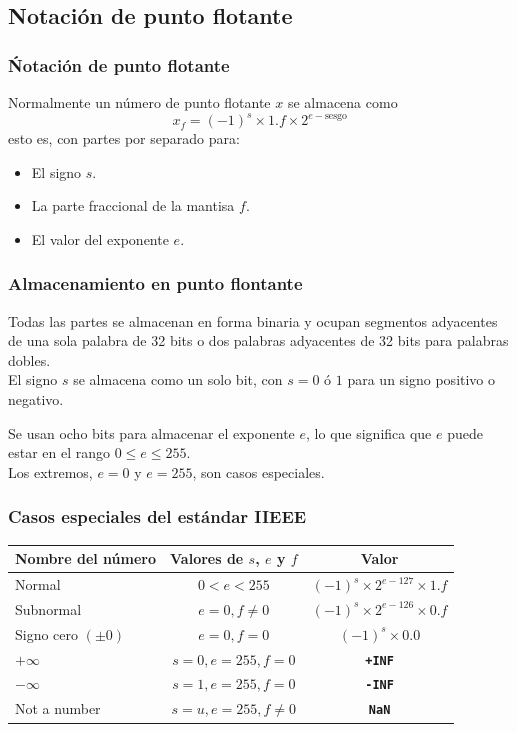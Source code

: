  \subsection{Notación de punto flotante}
 \begin{frame}
 \frametitle{Ńotación de punto flotante}
 Normalmente un número de punto flotante $x$ se almacena como
 \begin{equation}
 x_{f} = (-1)^{s} \times 1.f \times 2^{e - \text{sesgo}}
 \label{eq:ecuacion_01_02}
 \end{equation}
 esto es, con partes por separado para:
 \begin{itemize}[<+->]
 \item El signo $s$.
 \item La parte fraccional de la mantisa $f$.
 \item El valor del exponente $e$.
\end{itemize}
\end{frame}
\begin{frame}
\frametitle{Almacenamiento en punto flontante}
Todas las partes se almacenan en forma binaria y ocupan segmentos adyacentes de una sola palabra de 32 bits o dos palabras adyacentes de 32 bits para palabras dobles.
\\
\bigskip
El signo $s$ se almacena como un solo bit, con $s = 0$ ó $1$ para un signo positivo o negativo.
\end{frame}
\begin{frame}
Se usan ocho bits para almacenar el exponente $e$, lo que significa que $e$ puede estar en el rango $0 \leq e \leq 255$.
\\
\bigskip
Los extremos, $e = 0$ y $e = 255$, son casos especiales.
\end{frame}
\begin{frame}
\frametitle{Casos especiales del estándar IIEEE}
\begin{table}
\fontsize{10}{10}\selectfont
\begin{tabular}{l c c}
\hline
Nombre del número & Valores de $s$, $e$ y $f$ & Valor \\ \hline
Normal & $0 < e < 255$ & $(-1)^{s} \times 2^{e-127} \times 1.f$ \\ \hline
Subnormal & $e = 0, f \neq 0$ & $(-1)^{s} \times 2^{e-126} \times 0.f$ \\ \hline
Signo cero $(\pm 0)$ & $e = 0, f = 0$ & $(-1)^{s} \times 0.0$ \\ \hline
$+ \infty$ & $s = 0, e=255, f = 0$ & \textbf{\texttt{+INF}} \\ \hline
$- \infty$ & $s = 1, e=255, f = 0$ & \textbf{\texttt{-INF}} \\ \hline
Not a number & $s = u, e=255, f \neq 0$ & \textbf{\texttt{NaN}} \\ \hline
\end{tabular}
\end{table}
\end{frame}
